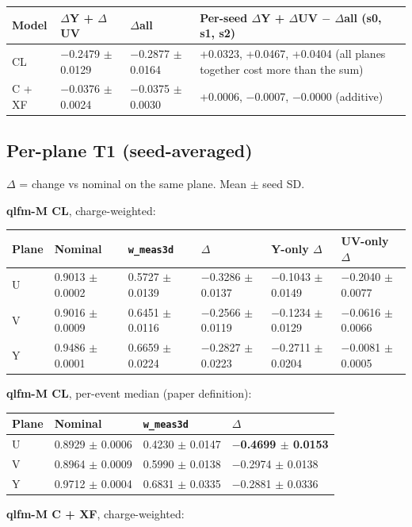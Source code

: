 \documentclass[10pt,a4paper]{article}
\begin{document}
\begin{center}\small
\setlength{\tabcolsep}{3pt}\renewcommand{\arraystretch}{1.15}
\begin{tabularx}{\linewidth}{LLLL}
\toprule
\textbf{Model} & \textbf{$\Delta$Y + $\Delta$UV} & \textbf{$\Delta$all} & \textbf{Per-seed $\Delta$Y + $\Delta$UV $-$ $\Delta$all (s0, s1, s2)} \\
\midrule
CL & $-$0.2479 $\pm$ 0.0129 & $-$0.2877 $\pm$ 0.0164 & +0.0323, +0.0467, +0.0404 (all planes together cost more than the sum) \\
C + XF & $-$0.0376 $\pm$ 0.0024 & $-$0.0375 $\pm$ 0.0030 & +0.0006, $-$0.0007, $-$0.0000 (additive) \\
\bottomrule
\end{tabularx}
\end{center}
\subsection{Per-plane T1 (seed-averaged)}
$\Delta$ = change vs nominal on the same plane. Mean $\pm$ seed SD.

\textbf{qlfm-M CL}, charge-weighted:

\begin{center}\footnotesize
\setlength{\tabcolsep}{3pt}\renewcommand{\arraystretch}{1.15}
\begin{tabularx}{\linewidth}{LLLLLL}
\toprule
\textbf{Plane} & \textbf{Nominal} & \textbf{\texttt{w\_\allowbreak{}meas3d}} & \textbf{$\Delta$} & \textbf{Y-only $\Delta$} & \textbf{UV-only $\Delta$} \\
\midrule
U & 0.9013 $\pm$ 0.0002 & 0.5727 $\pm$ 0.0139 & $-$0.3286 $\pm$ 0.0137 & $-$0.1043 $\pm$ 0.0149 & $-$0.2040 $\pm$ 0.0077 \\
V & 0.9016 $\pm$ 0.0009 & 0.6451 $\pm$ 0.0116 & $-$0.2566 $\pm$ 0.0119 & $-$0.1234 $\pm$ 0.0129 & $-$0.0616 $\pm$ 0.0066 \\
Y & 0.9486 $\pm$ 0.0001 & 0.6659 $\pm$ 0.0224 & $-$0.2827 $\pm$ 0.0223 & $-$0.2711 $\pm$ 0.0204 & $-$0.0081 $\pm$ 0.0005 \\
\bottomrule
\end{tabularx}
\end{center}
\textbf{qlfm-M CL}, per-event median (paper definition):

\begin{center}\small
\setlength{\tabcolsep}{3pt}\renewcommand{\arraystretch}{1.15}
\begin{tabularx}{\linewidth}{LLLL}
\toprule
\textbf{Plane} & \textbf{Nominal} & \textbf{\texttt{w\_\allowbreak{}meas3d}} & \textbf{$\Delta$} \\
\midrule
U & 0.8929 $\pm$ 0.0006 & 0.4230 $\pm$ 0.0147 & \textbf{$-$0.4699 $\pm$ 0.0153} \\
V & 0.8964 $\pm$ 0.0009 & 0.5990 $\pm$ 0.0138 & $-$0.2974 $\pm$ 0.0138 \\
Y & 0.9712 $\pm$ 0.0004 & 0.6831 $\pm$ 0.0335 & $-$0.2881 $\pm$ 0.0336 \\
\bottomrule
\end{tabularx}
\end{center}
\textbf{qlfm-M C + XF}, charge-weighted:
\end{document}
